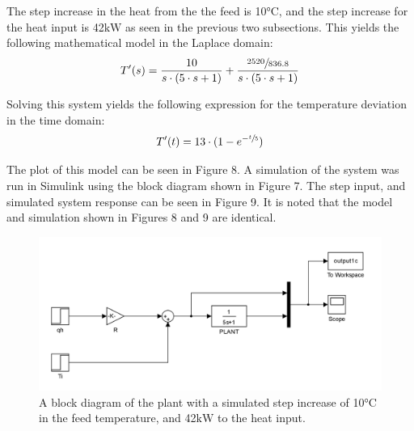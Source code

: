 \documentclass{article}
\begin{document}
The step increase in the heat from the the feed is 10$\si{\degreeCelsius}$, and the step increase for the heat input is 42$\si{\kilo\watt}$ as seen in the previous two subsections. This yields the following mathematical model in the Laplace domain:
\begin{align}
T'(s) = \frac{10}{s \cdot (5 \cdot s + 1)} + \frac{\sfrac{2520}{836.8}}{s \cdot (5 \cdot s + 1)}
\end{align}

Solving this system yields the following expression for the temperature deviation in the time domain:
\begin{align}
T'(t) = 13 \cdot (1 - e^{-\sfrac{t}{5}})
\end{align}

The plot of this model can be seen in Figure 8. A simulation of the system was run in Simulink using the block diagram shown in Figure 7. The step input, and simulated system response can be seen in Figure 9. It is noted that the model and simulation shown in Figures 8 and 9 are identical.

\begin{figure}[h]
\centering
\includegraphics[scale=0.15]{block_1c}
\caption{A block diagram of the plant with a simulated step increase of 10$\si{\degreeCelsius}$ in the feed temperature, and 42$\si{\kilo\watt}$ to the heat input.}
\end{figure}
\end{document}
